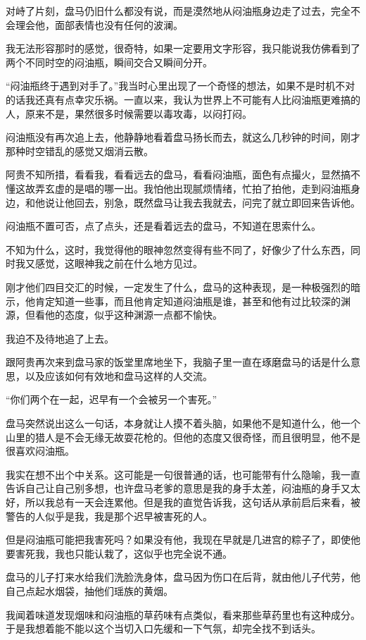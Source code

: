 对峙了片刻，盘马仍旧什么都没有说，而是漠然地从闷油瓶身边走了过去，完全不会理会他，面部表情也没有任何的波澜。

我无法形容那时的感觉，很奇特，如果一定要用文字形容，我只能说我仿佛看到了两个不同时空的闷油瓶，瞬间交合又瞬间分开。

“闷油瓶终于遇到对手了。”我当时心里出现了一个奇怪的想法，如果不是时机不对的话我还真有点幸灾乐祸。一直以来，我认为世界上不可能有人比闷油瓶更难搞的人，原来不是，果然很多时候需要以毒攻毒，以闷打闷。

闷油瓶没有再次追上去，他静静地看着盘马扬长而去，就这么几秒钟的时间，刚才那种时空错乱的感觉又烟消云散。

阿贵不知所措，看看我，看看远去的盘马，看看闷油瓶，面色有点撮火，显然搞不懂这故弄玄虚的是唱的哪一出。我怕他出现腻烦情绪，忙拍了拍他，走到闷油瓶身边，和他说让他回去，别急，既然盘马让我去我就去，问完了就立即回来告诉他。

闷油瓶不置可否，点了点头，还是看着远去的盘马，不知道在思索什么。

不知为什么，这时，我觉得他的眼神忽然变得有些不同了，好像少了什么东西，同时我又感觉，这眼神我之前在什么地方见过。

刚才他们四目交汇的时候，一定发生了什么，盘马的这种表现，是一种极强烈的暗示，他肯定知道一些事，而且他肯定知道闷油瓶是谁，甚至和他有过比较深的渊源，但看他的态度，似乎这种渊源一点都不愉快。

我迫不及待地追了上去。

跟阿贵再次来到盘马家的饭堂里席地坐下，我脑子里一直在琢磨盘马的话是什么意思，以及应该如何有效地和盘马这样的人交流。

“你们两个在一起，迟早有一个会被另一个害死。”

盘马突然说出这么一句话，本身就让人摸不着头脑，如果他不是知道什么，他一个山里的猎人是不会无缘无故耍花枪的。但他的态度又很奇怪，而且很明显，他不是很喜欢闷油瓶。

我实在想不出个中关系。这可能是一句很普通的话，也可能带有什么隐喻，我一直告诉自己让自己别多想，也许盘马老爹的意思是我的身手太差，闷油瓶的身手又太好，所以我总有一天会连累他。但是我的直觉告诉我，这句话从承前启后来看，被警告的人似乎是我，我是那个迟早被害死的人。

但是闷油瓶可能把我害死吗？如果没有他，我现在早就是几进宫的粽子了，即使他要害死我，我也只能认栽了，这似乎也完全说不通。

盘马的儿子打来水给我们洗脸洗身体，盘马因为伤口在后背，就由他儿子代劳，他自己点起水烟袋，抽他们瑶族的黄烟。

我闻着味道发现烟味和闷油瓶的草药味有点类似，看来那些草药里也有这种成分。于是我想着能不能以这个当切入口先缓和一下气氛，却完全找不到话头。

